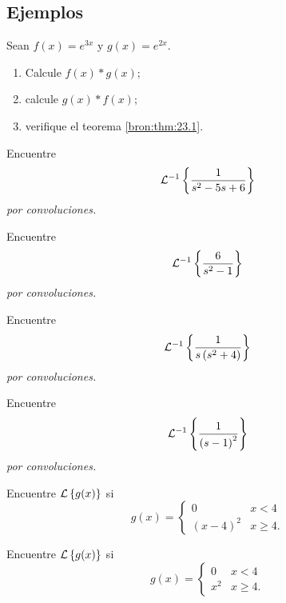 \subsection{Ejemplos}


	\begin{problema}
		\label{bron:exmp:23.1} Sean $f(x)=e^{3x}$ y $g(x)=e^{2x}.$
		\begin{enumerate}
			\item Calcule $f(x) \ast g(x);$
			\item calcule $g(x) \ast f(x);$
			\item verifique el teorema \ref{bron:thm:23.1}.
		\end{enumerate}
		
	\end{problema}
	



	\begin{problema}
		\label{bron:exmp:23.4}
		Encuentre
		$$
		\mathcal{L}^{-1}\left\{ \dfrac{1}{s^{2}-5s+6} \right\}
		$$
		\emph{por convoluciones.}
	\end{problema}
	



	\begin{problema}
		\label{bron:exmp:23.5}
		Encuentre
		$$
		\mathcal{L}^{-1}\left\{ \dfrac{6}{s^{2}-1} \right\}
		$$
		\emph{por convoluciones.}
	\end{problema}
	



	\begin{problema}
		\label{bron:exmp:23.6}
		Encuentre
		$$
		\mathcal{L}^{-1}\left\{ \dfrac{1}{s\left( s^{2}+4 \right)} \right\}
		$$
		\emph{por convoluciones.}
	\end{problema}
	



	\begin{problema}
		\label{bron:exmp:23.7}
		Encuentre
		$$
		\mathcal{L}^{-1}\left\{ \dfrac{1}{\left( s-1 \right)^{2}} \right\}
		$$
		\emph{por convoluciones.}
	\end{problema}
	



	\begin{problema}
		\label{bron:exmp:23.13}
		Encuentre $\mathcal{L}\left\{ g(x) \right\}$ si
		$$
		g(x)=\begin{cases}
		0 & x<4\\
		\left( x-4 \right)^{2} & x\geq 4.
		\end{cases}
		$$
	\end{problema}
	



	\begin{problema}
		\label{bron:exmp:23.14}
		Encuentre $\mathcal{L}\left\{ g(x) \right\}$ si
		$$
		g(x)=\begin{cases}
		0 & x<4\\
		x^{2} & x\geq 4.
		\end{cases}
		$$
	\end{problema}
	


